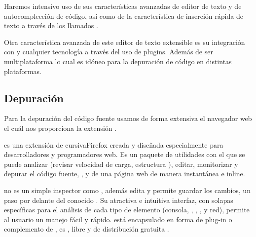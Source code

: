 Haremos intensivo uso de sus características avanzadas de editor de texto y de
autocomplección de código, así como de la característica de inserción rápida de
texto a través de los llamados  \cite{prog:snippets}.

Otra característica avanzada de este editor de texto extensible es su
integración con  y cualquier tecnología a través del uso de
plugins. Además de ser multiplataforma lo cual es idóneo para la depuración de
código  en distintas plataformas.

\subsection{Depuración}
Para la depuración del código fuente usamos de forma extensiva el navegador web
 \cite{prog:firefox} el cuál nos proporciona la extensión
 \cite{prog:firebug}.

 es una extensión de cursiva{Firefox} creada y diseñada
especialmente para desarrolladores y programadores web. Es un paquete de
utilidades con el que se puede analizar (revisar velocidad de carga, estructura
), editar, monitorizar y depurar el código fuente, ,
 y  de una página web de manera instantánea e
inline.


 no es un simple inspector como , además edita y
permite guardar los cambios, un paso por delante del conocido . Su atractiva e intuitiva interfaz, con solapas específicas para el
análisis de cada tipo de elemento (consola, , ,
,  y red), permite al usuario un manejo fácil y
rápido.  está encapsulado en forma de plug-in o complemento de
, es , libre y de distribución gratuita \cite{wiki:firebug}.

